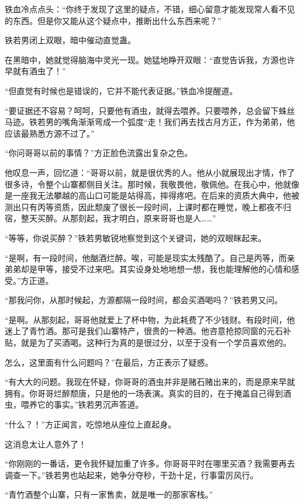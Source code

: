 \begin{this_body}
铁血冷点点头：“你终于发现了这里的疑点，不错，细心留意才能发现常人看不见的东西。但是你又能从这个疑点中，推断出什么东西来呢？”

铁若男闭上双眼，暗中催动直觉蛊。

在黑暗中，她就觉得脑海中灵光一现。她猛地睁开双眼：“直觉告诉我，方源也许早就有酒虫了！”

“但直觉有时候也是错误的，它并不能代表证据。”铁血冷提醒道。

“要证据还不容易？呵呵，只要他有酒虫，就得去喂养。只要喂养，总会留下蛛丝马迹。铁若男的嘴角渐渐弯成一个弧度“走！我们再去找古月方正，作为弟弟，他应该最熟悉方源不过了。”

“你问哥哥以前的事情？”方正脸色流露出复杂之色。

他叹息一声，回忆道：“哥哥以前，就是很优秀的人。他从小就展现出才情，作了很多诗，令整个山寨都侧目关注。那时候，我敬畏他，敬佩他。在我心中，他就像是一座我无法攀越的高山口可能是站得高，摔得疼吧。在后来的资质大典中，他被测出只有丙等资质，因此颓废了很长一段时间，上课时都在睡觉，晚上都夜不归宿，整天买醉。从那刻起，我才明白，原来哥哥也是人……”

“等等，你说买醉？”铁若男敏锐地察觉到这个关键词，她的双眼眯起来。

“是啊，有一段时间，他酗酒烂醉。唉，可能是现实太残酷了。自己是丙等，而亲弟弟却是甲等，接受不过来吧。其实设身处地地想一想，我也能理解他的心情和感受。”方正道。

“那我问你，从那时候起，方源都隔一段时间，都会买酒喝吗？”铁若男又问。

“是啊。从那刻起，哥哥他就爱上了杯中物，为此耗费了不少钱财。有段时间，他迷上了青竹酒。那可是我们山寨特产，很贵的一种酒。他咨意抢掠同窗的元石补贴，就是为了买酒喝。这种行为真的是很过分，以至于没有一个学员喜欢他的。

怎么，这里面有什么问题吗？”在最后，方正表示了疑惑。

“有大大的问题。我现在怀疑，你哥哥的酒虫并非是赌石赌出来的，而是原来早就拥有。你哥哥烂醉颓唐，只是他的一场表演。真实的目的，在于掩盖自己得到酒虫，喂养它的事实。”铁若男沉声答道。

“什么？！”方正闻言，吃惊地从座位上直起身。

这消息太让人意外了！

“你刚刚的一番话，更令我怀疑加重了许多。你哥哥平时在哪里买酒？我需要再去调查一下。”铁若男也站起来，她争分夺秒，干劲十足，行事雷厉风行。

“青竹酒整个山寨，只有一家售卖，就是唯一的那家客栈。”


\end{this_body}

